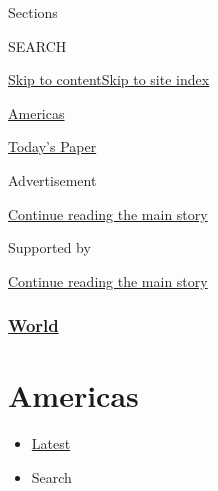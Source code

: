 Sections

SEARCH

\protect\hyperlink{site-content}{Skip to
content}\protect\hyperlink{site-index}{Skip to site index}

\href{https://www.nytimes3xbfgragh.onion/section/world/americas}{Americas}

\href{https://myaccount.nytimes3xbfgragh.onion/auth/login?response_type=cookie\&client_id=vi}{}

\href{https://www.nytimes3xbfgragh.onion/section/todayspaper}{Today's
Paper}

Advertisement

\protect\hyperlink{after-top}{Continue reading the main story}

Supported by

\protect\hyperlink{after-sponsor}{Continue reading the main story}

\hypertarget{world}{%
\subsubsection{\texorpdfstring{\href{/section/world}{World}}{World}}\label{world}}

\hypertarget{americas}{%
\section{Americas}\label{americas}}

\begin{itemize}
\tightlist
\item
  \protect\hyperlink{stream-panel}{Latest}
\item
  Search
\end{itemize}

